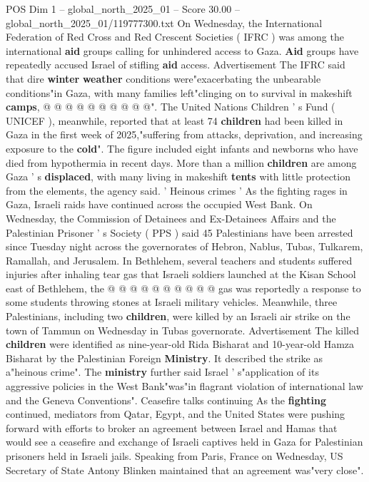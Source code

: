 \begin{textsample}{POS Dim 1 – global\_north\_2025\_01 – Score 30.00 – global\_north\_2025\_01/119777300.txt}
On Wednesday, the International Federation of Red Cross and Red Crescent Societies ( IFRC ) was among the international \textbf{aid} groups calling for unhindered access to Gaza. \textbf{Aid} groups have repeatedly accused Israel of stifling \textbf{aid} access.
Advertisement The IFRC said that dire \textbf{winter} \textbf{weather} conditions were"exacerbating the unbearable conditions"in Gaza, with many families left"clinging on to survival in makeshift \textbf{camps}, @ @ @ @ @ @ @ @ @ @".
The United Nations Children ' s Fund ( UNICEF ), meanwhile, reported that at least 74 \textbf{children} had been killed in Gaza in the first week of 2025,"suffering from attacks, deprivation, and increasing exposure to the \textbf{cold}".
The figure included eight infants and newborns who have died from hypothermia in recent days.
More than a million \textbf{children} are among Gaza ' s \textbf{displaced}, with many living in makeshift \textbf{tents} with little protection from the elements, the agency said. ' Heinous crimes ' As the fighting rages in Gaza, Israeli raids have continued across the occupied West Bank.
On Wednesday, the Commission of Detainees and Ex-Detainees Affairs and the Palestinian Prisoner ' s Society ( PPS ) said 45 Palestinians have been arrested since Tuesday night across the governorates of Hebron, Nablus, Tubas, Tulkarem, Ramallah, and Jerusalem.
In Bethlehem, several teachers and students suffered injuries after inhaling tear gas that Israeli soldiers launched at the Kisan School east of Bethlehem, the @ @ @ @ @ @ @ @ @ @ gas was reportedly a response to some students throwing stones at Israeli military vehicles.
Meanwhile, three Palestinians, including two \textbf{children}, were killed by an Israeli air strike on the town of Tammun on Wednesday in Tubas governorate.
Advertisement The killed \textbf{children} were identified as nine-year-old Rida Bisharat and 10-year-old Hamza Bisharat by the Palestinian Foreign \textbf{Ministry}.
It described the strike as a"heinous crime".
The \textbf{ministry} further said Israel ' s"application of its aggressive policies in the West Bank"was"in flagrant violation of international law and the Geneva Conventions".
Ceasefire talks continuing As the \textbf{fighting} continued, mediators from Qatar, Egypt, and the United States were pushing forward with efforts to broker an agreement between Israel and Hamas that would see a ceasefire and exchange of Israeli captives held in Gaza for Palestinian prisoners held in Israeli jails.
Speaking from Paris, France on Wednesday, US Secretary of State Antony Blinken maintained that an agreement was"very close".

\end{textsample}
